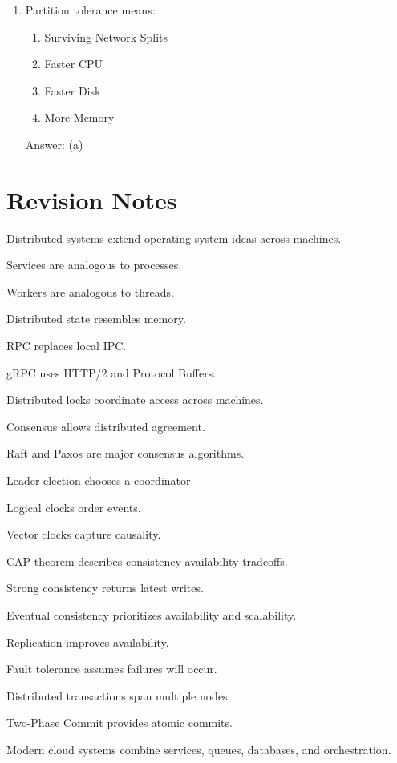 \begin{enumerate}
\item Partition tolerance means:
\begin{enumerate}[label=(\alph*)]
\item Surviving Network Splits
\item Faster CPU
\item Faster Disk
\item More Memory
\end{enumerate}
Answer: (a)

\end{enumerate}

\section{Revision Notes}

\begin{revisionnotes}
\item Distributed systems extend operating-system ideas across machines.
\item Services are analogous to processes.
\item Workers are analogous to threads.
\item Distributed state resembles memory.
\item RPC replaces local IPC.
\item gRPC uses HTTP/2 and Protocol Buffers.
\item Distributed locks coordinate access across machines.
\item Consensus allows distributed agreement.
\item Raft and Paxos are major consensus algorithms.
\item Leader election chooses a coordinator.
\item Logical clocks order events.
\item Vector clocks capture causality.
\item CAP theorem describes consistency-availability tradeoffs.
\item Strong consistency returns latest writes.
\item Eventual consistency prioritizes availability and scalability.
\item Replication improves availability.
\item Fault tolerance assumes failures will occur.
\item Distributed transactions span multiple nodes.
\item Two-Phase Commit provides atomic commits.
\item Modern cloud systems combine services, queues, databases, and orchestration.
\end{revisionnotes}


